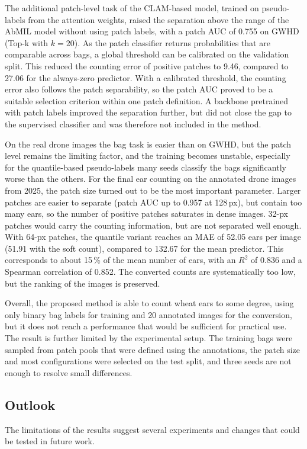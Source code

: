 \documentclass[12pt,parskip = half, DIV=classic,listof=totoc]{scrartcl}
\begin{document}
			The additional patch-level task of the CLAM-based model, trained on pseudo-labels from the attention weights, 
			raised the separation above the range of the AbMIL model without using patch labels, with a patch AUC of 0.755 
			on GWHD (Top-k with $k = 20$). As the patch classifier returns probabilities that are comparable across bags, 
			a global threshold can be calibrated on the validation split. This reduced the counting error of positive 
			patches to 9.46, compared to 27.06 for the always-zero predictor. With a calibrated threshold, the counting 
			error also follows the patch separability, so the patch AUC proved to be a suitable selection criterion within 
			one patch definition. A backbone pretrained with patch labels improved the separation further, but did not 
			close the gap to the supervised classifier and was therefore not included in the method.

			On the real drone images the bag task is easier than on GWHD, but the patch level remains the limiting factor, 
			and the training becomes unstable, especially for the quantile-based pseudo-labels many seeds classify the bags significantly worse than the others. 
			For the final ear counting on the annotated drone images from 2025, the patch size turned out to be the most 
			important parameter. Larger patches are easier to separate (patch AUC up to 0.957 at 128\,px), but contain too 
			many ears, so the number of positive patches saturates in dense images. 32-px patches would carry the counting 
			information, but are not separated well enough. With 64-px patches, the quantile variant reaches an MAE of 
			52.05 ears per image (51.91 with the soft count), compared to 132.67 for the mean predictor. This corresponds 
			to about 15\,\% of the mean number of ears, with an $R^2$ of 0.836 and a Spearman correlation of 0.852. 
			The converted counts are systematically too low, but the ranking of the images is preserved.

			Overall, the proposed method is able to count wheat ears to some degree, using only binary bag labels for 
			training and 20 annotated images for the conversion, but it does not reach a performance that would be 
			sufficient for practical use. The result is further limited by the experimental setup. The training bags were 
			sampled from patch pools that were defined using the annotations, the patch size and most configurations were 
			selected on the test split, and three seeds are not enough to resolve small differences.

		\subsection{Outlook}
			The limitations of the results suggest several experiments and changes that could be tested in future work.
\end{document}
